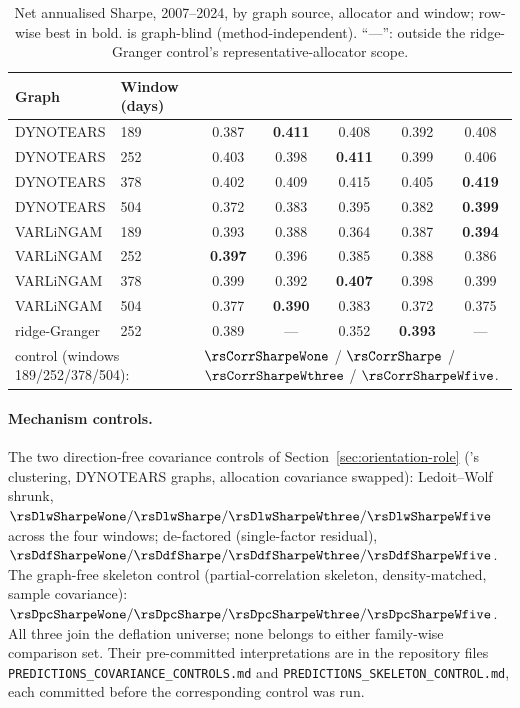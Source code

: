 \begin{table}[h]
  \centering
  \caption{Net annualised Sharpe, 2007--2024, by graph source, allocator and
    window; row-wise best in bold. \HRP{} is graph-blind
    (method-independent). ``---'': outside the ridge-Granger control's
    representative-allocator scope.}
  \label{tab:matrix-full}
  \small
  \setlength{\tabcolsep}{4.5pt}
  \begin{tabular}{l l c c c c c}
    \toprule
    Graph & Window (days) & \skelsamp{} & \skelalt{} & \skelsem{} & \orientsamp{} & \orientsem{} \\
    \midrule
    DYNOTEARS & 189 & 0.387 & \textbf{0.411} & 0.408 & 0.392 & 0.408 \\
    DYNOTEARS & 252 & 0.403 & 0.398 & \textbf{0.411} & 0.399 & 0.406 \\
    DYNOTEARS & 378 & 0.402 & 0.409 & 0.415 & 0.405 & \textbf{0.419} \\
    DYNOTEARS & 504 & 0.372 & 0.383 & 0.395 & 0.382 & \textbf{0.399} \\
    VARLiNGAM & 189 & 0.393 & 0.388 & 0.364 & 0.387 & \textbf{0.394} \\
    VARLiNGAM & 252 & \textbf{0.397} & 0.396 & 0.385 & 0.388 & 0.386 \\
    VARLiNGAM & 378 & 0.399 & 0.392 & \textbf{0.407} & 0.398 & 0.399 \\
    VARLiNGAM & 504 & 0.377 & \textbf{0.390} & 0.383 & 0.372 & 0.375 \\
    ridge-Granger   & 252 & 0.389 & --- & 0.352 & \textbf{0.393} & --- \\
    \midrule
    \multicolumn{2}{l}{\HRP{} control (windows 189/252/378/504):} &
    \multicolumn{5}{l}{$\rsCorrSharpeWone$ / $\rsCorrSharpe$ /
      $\rsCorrSharpeWthree$ / $\rsCorrSharpeWfive$.} \\
    \bottomrule
  \end{tabular}
\end{table}

\paragraph{Mechanism controls.} The two direction-free covariance
controls of Section~\ref{sec:orientation-role} (\skelsamp{}'s clustering,
DYNOTEARS graphs, allocation covariance swapped): Ledoit--Wolf shrunk,
$\rsDlwSharpeWone/\rsDlwSharpe/\rsDlwSharpeWthree/\rsDlwSharpeWfive$
across the four windows; de-factored (single-factor residual),
$\rsDdfSharpeWone/\rsDdfSharpe/\rsDdfSharpeWthree/\rsDdfSharpeWfive$.
The graph-free skeleton control (partial-correlation skeleton,
density-matched, sample covariance):
$\rsDpcSharpeWone/\rsDpcSharpe/\rsDpcSharpeWthree/\rsDpcSharpeWfive$.
All three join the deflation universe; none belongs to either
family-wise
comparison set. Their pre-committed interpretations are in the
repository files \texttt{PREDICTIONS\_COVARIANCE\_CONTROLS.md} and
\texttt{PREDICTIONS\_SKELETON\_CONTROL.md}, each committed
before the corresponding control was run.

